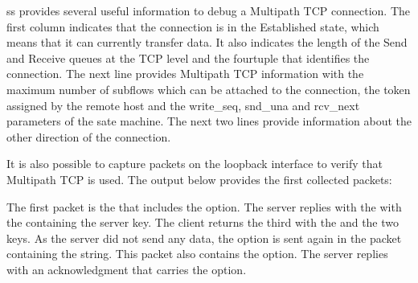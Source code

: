 \documentclass[letterpaper,10pt,english]{sphinxmanual}
\begin{document}
\sphinxAtStartPar
ss provides several useful information to debug a Multipath TCP connection. The first column indicates that the connection is in the Established state, which means that it can currently transfer data. It also indicates the length of the Send and Receive queues at the TCP level and the four\sphinxhyphen{}tuple that identifies the connection. The next line provides Multipath TCP information with the maximum number of subflows which can be attached to the connection, the token assigned by the remote host and the write\_seq, snd\_una and rcv\_next parameters of the sate machine. The next two lines provide information about the other direction of the connection.

\sphinxAtStartPar
It is also possible to capture packets on the loopback interface to verify that Multipath TCP is used. The output below provides the first collected packets:

\begin{sphinxVerbatim}[commandchars=\\\{\}]
\end{sphinxVerbatim}

\sphinxAtStartPar
The first packet is the  that includes the  option. The server replies with the  with the  containing the server key. The client returns the third  with the  and the two keys. As the server did not send any data, the  option is sent again in the packet containing the  string. This packet also contains the  option. The server replies with an acknowledgment that carries the  option.
\end{document}
